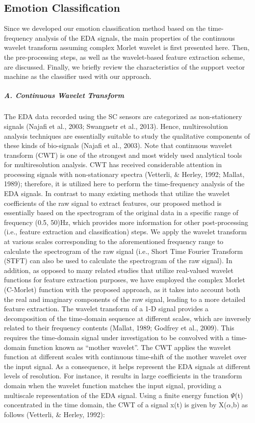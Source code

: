 \subsection{Emotion Classification}
Since we developed our emotion classification method based on the time-frequency analysis of the
EDA signals, the main properties of the continuous wavelet transform assuming complex Morlet
wavelet is first presented here. Then, the pre-processing steps, as well as the wavelet-based
feature extraction scheme, are discussed. Finally, we briefly review the characteristics of the
support vector machine as the classifier used with our approach.\\

\subparagraph{A. Continuous Wavelet Transform}
The EDA data recorded using the SC sensors are categorized as non-stationery signals 
(Najafi et al., 2003; Swangnetr et al., 2013). Hence, multiresolution analysis 
techniques are essentially suitable to study the qualitative components of these 
kinds of bio-signals (Najafi et al., 2003).  Note that continuous wavelet transform 
(CWT) is one of the strongest and most widely used analytical tools for multiresolution 
analysis. CWT has received considerable attention in processing signals with 
non-stationary spectra (Vetterli, \& Herley, 1992; Mallat, 1989); therefore, it is 
utilized here to perform the time-frequency analysis of the EDA signals. In contrast 
to many existing methods that utilize the wavelet coefficients of the raw signal to 
extract features, our proposed method is essentially based on the spectrogram of the 
original data in a specific range of frequency (0.5, 50)Hz, which provides more 
information for other post-processing (i.e., feature extraction and classification) 
steps. We apply the wavelet transform at various scales corresponding to the 
aforementioned frequency range to calculate the spectrogram of the raw signal 
(i.e., Short Time Fourier Transform (STFT) can also be used to calculate the 
spectrogram of the raw signal). In addition, as opposed to many related studies 
that utilize real-valued wavelet functions for feature extraction purposes, we have 
employed the complex Morlet (C-Morlet) function with the proposed approach, as it 
takes into account both the real and imaginary components of the raw signal, leading 
to a more detailed feature extraction.
The wavelet transform of a 1-D signal provides a decomposition of the time-domain 
sequence at different scales, which are inversely related to their frequency contents 
(Mallat, 1989; Godfrey et al., 2009). This requires the time-domain signal under 
investigation to be convolved with a time-domain function known as “mother wavelet”. 
The CWT applies the wavelet function at different scales with continuous time-shift 
of the mother wavelet over the input signal. As a consequence, it helps represent 
the EDA signals at different levels of resolution. For instance, it results in large 
coefficients in the transform domain when the wavelet function matches the input 
signal, providing a multiscale representation of the EDA signal.
Using a finite energy function $\Psi$(t) concentrated in the time domain, the CWT of 
a signal x(t) is given by X($\alpha$,b) as follows (Vetterli, \& Herley, 1992):

